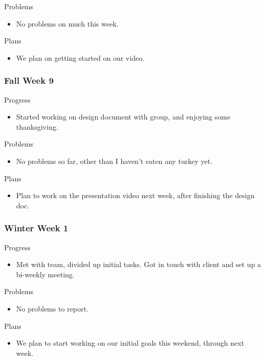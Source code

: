         \noindent
        Problems
        \begin{itemize}
            \item No problems on much this week.
        \end{itemize}
        
        \noindent
        Plans
        \begin{itemize}
            \item We plan on getting started on our video. 
        \end{itemize}
    \subsubsection{Fall Week 9}
        \noindent
        Progress
        \begin{itemize}
            \item Started working on design document with group, and enjoying some thanksgiving.
        \end{itemize}
        
        \noindent
        Problems
        \begin{itemize}
            \item No problems so far, other than I haven't eaten any turkey yet.
        \end{itemize}
        
        \noindent
        Plans
        \begin{itemize}
            \item Plan to work on the presentation video next week, after finishing the design doc.
        \end{itemize}
    \subsubsection{Winter Week 1}
        \noindent
        Progress
        \begin{itemize}
            \item Met with team, divided up initial tasks. Got in touch with client and set up a bi-weekly meeting.
        \end{itemize}
        
        \noindent
        Problems
        \begin{itemize}
            \item No problems to report.
        \end{itemize}
        
        \noindent
        Plans
        \begin{itemize}
            \item We plan to start working on our initial goals this weekend, through next week.
        \end{itemize}
